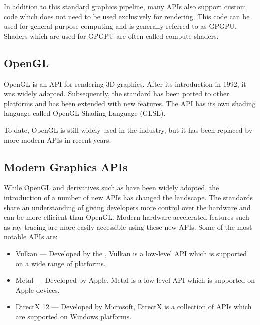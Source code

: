 In addition to this standard graphics pipeline, many \glspl{API} also support custom code which does not need to be used exclusively for rendering. This code can be used for general-purpose computing and is generally referred to as \gls{GPGPU}. Shaders which are used for \gls{GPGPU} are often called compute shaders.

\subsection{OpenGL}

\gls{OpenGL} is an \gls{API} for rendering 3D graphics. After its introduction in 1992, it was widely adopted. Subsequently, the standard has been ported to other platforms and has been extended with new features. The \gls{API} has its own shading language called OpenGL Shading Language (\gls{GLSL}).

To date, \gls{OpenGL} is still widely used in the industry, but it has been replaced by more modern \glspl{API} in recent years.

\subsection{Modern Graphics APIs}

While \gls{OpenGL} and derivatives such as  have been widely adopted, the introduction of a number of new \glspl{API} has changed the landscape. The standards share an understanding of giving developers more control over the hardware and can be more efficient than \gls{OpenGL}. Modern hardware-accelerated features such as ray tracing are more easily accessible using these new \glspl{API}. Some of the most notable \glspl{API} are:

\begin{itemize}
    \item{\gls{Vulkan}} — Developed by the , Vulkan is a low-level \gls{API} which is supported on a wide range of platforms.
    \item{\gls{Metal}} — Developed by Apple, Metal is a low-level \gls{API} which is supported on Apple devices.
    \item{\gls{DirectX 12}} — Developed by Microsoft, DirectX is a collection of \glspl{API} which are supported on Windows platforms.
\end{itemize}

